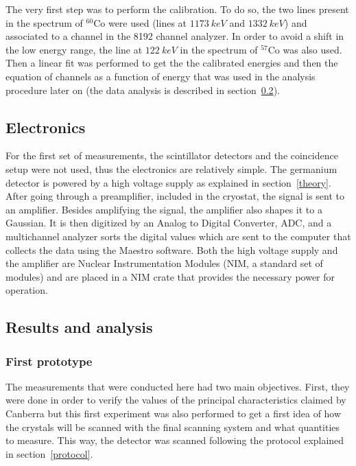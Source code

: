 \documentclass[11pt,a4paper]{article}
\begin{document}
The very first step was to perform the calibration. To do so, the two lines present in the spectrum of $^{60}$Co were used (lines at $1173~keV$ and $1332~keV$) and associated to a channel in the 8192 channel analyzer. In order to avoid a shift in the low energy range, the line at $122~keV$ in the spectrum of $^{57}$Co was also used. Then a linear fit was performed to get the the calibrated energies and then the equation of channels as a function of energy that was used in the analysis procedure later on (the data analysis is described in section~\ref{analysis}).

\subsection{Electronics}

For the first set of measurements, the scintillator detectors and the coincidence setup were not used, thus the electronics are relatively simple. The germanium detector is powered by a high voltage supply as explained in section~\ref{theory}. After going through a preamplifier, included in the cryostat, the signal is sent to an amplifier. Besides amplifying the signal, the amplifier also shapes it to a Gaussian. It is then digitized by an Analog to Digital Converter, ADC, and a multichannel analyzer sorts the digital values which are sent to the computer that collects the data using the Maestro software. Both the high voltage supply and the amplifier are Nuclear Instrumentation Modules (NIM, a standard set of modules) and are placed in a NIM crate that provides the necessary power for operation.

\subsection{Results and analysis} \label{analysis}

\subsubsection{First prototype}

The measurements that were conducted here had two main objectives. First, they were done in order to verify the values of the principal characteristics claimed by Canberra but this first experiment was also performed to get a first idea of how the crystals will be scanned with the final scanning system and what quantities to measure. This way, the detector was scanned following the protocol explained in section~\ref{protocol}.
\end{document}
